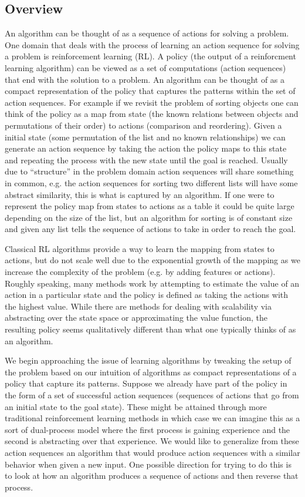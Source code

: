 \documentclass[a4paper,12pt]{article}
\begin{document}
\subsection{Overview}
An algorithm can be thought of as a sequence of actions for solving a problem.  One domain that deals with the process of learning an action sequence for solving a problem is reinforcement learning (RL).  A policy (the output of a reinforcment learning algorithm) can be viewed as a set of computations (action sequences)
that end with the solution to a problem.  An algorithm can be thought
of as a compact representation of the policy that captures the patterns within the set of action sequences.  For example if we revisit the problem of sorting objects one can think of the policy as a map from state (the known relations between objects and permutations of their order) to actions (comparison and reordering).  Given a initial state (some permutation of the list and no known relationships) we can generate an action sequence by taking the action the policy maps to this state and repeating the process with the new state until the goal is reached.   Usually due to ``structure'' in the problem domain action sequences will share something in common, e.g. the action sequences for sorting two different lists will have some abstract similarity, this is what is captured by an algorithm.  If one were to represent the policy map from states to actions as a table it could be quite large depending on the size of the list, but an algorithm for sorting is of constant size and given any list tells the sequence of actions to take in order to reach the goal.

Classical RL algorithms provide a way to learn the mapping from states to actions, but do not scale well due to the exponential growth of the mapping as we increase the complexity of the problem (e.g. by adding features or actions).  Roughly speaking, many methods work by attempting to estimate the value of an action in a particular state and the policy is defined as taking the actions with the highest value.  While there are methods for dealing with scalability via abstracting over the state space or approximating the value function, the resulting policy seems qualitatively different than what one typically thinks of as an algorithm.

We begin approaching the issue of learning algorithms by tweaking the setup of the problem based on our intuition of algorithms as compact representations of a policy that capture its patterns.  Suppose we already have part of the policy in the form of a set of successful action sequences (sequences of actions that go from an initial state to the goal state).  These might be attained through more traditional reinforcement learning methods in which case we can imagine this as a sort of dual-process model where the first process is gaining experience and the second is abstracting over that experience.  We would like to generalize from these action sequences an algorithm that would produce action sequences with a similar behavior when given a new input.  One possible direction for trying to do this is to look at how an algorithm produces a sequence of actions and then reverse that process.  
\end{document}
